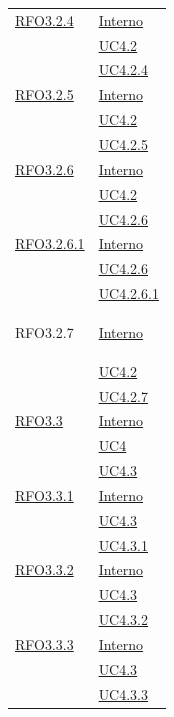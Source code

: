 \begin{longtable}{|>{\centering}m{5cm}|m{5cm}<{\centering}|}
\hyperlink{RFO3.2.4}{RFO3.2.4} & \hyperlink{Interno}{Interno}\\
& \hyperref[UC4.2]{UC4.2}\\
& \hyperref[UC4.2.4]{UC4.2.4}\\ \hline

\hyperlink{RFO3.2.5}{RFO3.2.5} & \hyperlink{Interno}{Interno}\\
& \hyperref[UC4.2]{UC4.2}\\
& \hyperref[UC4.2.5]{UC4.2.5}\\ \hline

\hyperlink{RFO3.2.6}{RFO3.2.6} & \hyperlink{Interno}{Interno}\\
& \hyperref[UC4.2]{UC4.2}\\
& \hyperref[UC4.2.6]{UC4.2.6}\\ \hline

\hyperlink{RFO3.2.6.1}{RFO3.2.6.1} & \hyperlink{Interno}{Interno}\\
& \hyperref[UC4.2.6]{UC4.2.6}\\
& \hyperref[UC4.2.6.1]{UC4.2.6.1}\\ \hline

\hypertarget{RFO3.2.7}{RFO3.2.7} &\hyperlink{Interno}{Interno}\\
&\hyperref[UC4.2]{UC4.2}\\
&\hyperref[UC4.2.7]{UC4.2.7}\\ \hline

\hyperlink{RFO3.3}{RFO3.3} & \hyperlink{Interno}{Interno}\\
& \hyperref[UC4]{UC4}\\
& \hyperref[UC4.3]{UC4.3}\\ \hline

\hyperlink{RFO3.3.1}{RFO3.3.1} & \hyperlink{Interno}{Interno}\\
& \hyperref[UC4.3]{UC4.3}\\
& \hyperref[UC4.3.1]{UC4.3.1}\\ \hline

\hyperlink{RFO3.3.2}{RFO3.3.2} & \hyperlink{Interno}{Interno}\\
& \hyperref[UC4.3]{UC4.3}\\
& \hyperref[UC4.3.2]{UC4.3.2}\\ \hline

\hyperlink{RFO3.3.3}{RFO3.3.3} & \hyperlink{Interno}{Interno}\\
& \hyperref[UC4.3]{UC4.3}\\
& \hyperref[UC4.3.3]{UC4.3.3}\\ \hline


\end{longtable}
